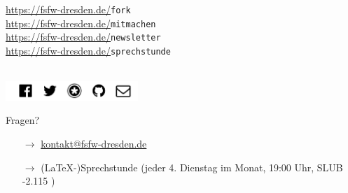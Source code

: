 \documentclass{beamer}
\begin{document}
\begin{frame}

  \onslide<+->

  

  \begin{center}
  \parbox{7.3cm}{
  {\color{gray!20}     \url{https://fsfw-dresden.de/}}\texttt{fork}\\[1mm]
  {\color{gray!40}     \url{https://fsfw-dresden.de/}}\texttt{mitmachen}\\[1mm]
  {\color{gray!60}     \url{https://fsfw-dresden.de/}}\texttt{newsletter}\\[1mm]
  {\color{gray!80}     \url{https://fsfw-dresden.de/}}\texttt{sprechstunde}\\[3mm]
}\\[3mm]

    \includegraphics[width=50mm]{fsfw-netzwerke}\\[3mm]
    
    \parbox{7.8cm}{
    Fragen?
    \begin{itemize}
     \item[$\rightarrow$]\url{kontakt@fsfw-dresden.de}
     \item[$\rightarrow$] (LaTeX-)Sprechstunde (jeder 4. Dienstag im Monat, 19:00 Uhr, SLUB -2.115 )
    \end{itemize}

  }
  \end{center}

\end{frame}
\end{document}
